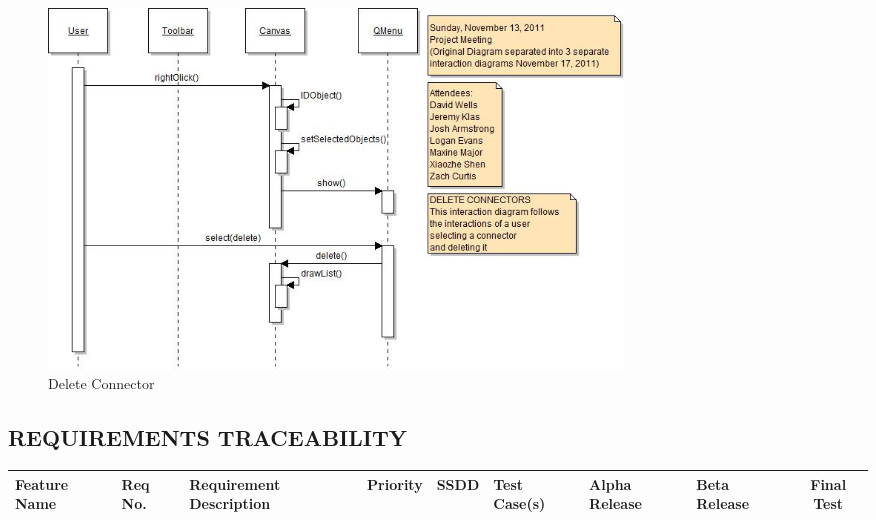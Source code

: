 \documentclass[twoside,letterpaper]{article}
\begin{document}
{\begin{figure}[h]
\centering
\includegraphics[width=6.0in]{IntDelConn.jpg}
\caption{Delete Connector}
\end{figure}

\clearpage

  






\clearpage

\begin{landscape}

\section[REQUIREMENTS TRACEABILITY]
  {\bfseries REQUIREMENTS TRACEABILITY}
{\itshape }

\bigskip

\begin{flushleft}
\tablehead{}
\begin{supertabular}[c]{|
                        m{0.9in}|m{0.4in}|m{2.0in}|
                        m{0.4in}|m{0.5in}|m{1.0in}|
                        m{1.0in}|m{1.0in}|c|
                       }
\hline
 
  \centering \bfseries Feature Name &
  \centering \bfseries Req No. &
  \centering \bfseries Requirement Description &
  \centering \bfseries Priority &
  \centering \bfseries SSDD &
  \centering \bfseries Test Case(s) & 
  \centering \bfseries Alpha Release &
  \centering \bfseries Beta Release &
  \bfseries Final Test
\\\hline
  

\end{supertabular}
\end{flushleft}
\end{landscape}}
\end{document}
